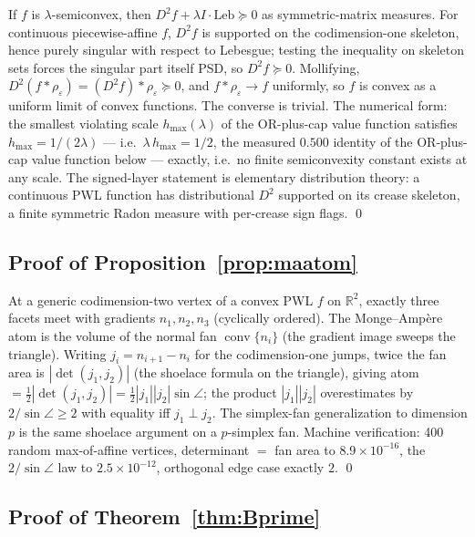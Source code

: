 \documentclass[11pt,a4paper]{article}
\theoremstyle{plain}
\theoremstyle{definition}
\theoremstyle{remark}
\newcommand{\RR}{\mathbb{R}}
\begin{document}
If $f$ is $\lambda$-semiconvex, then $D^2 f + \lambda I \cdot
\mathrm{Leb} \succeq 0$ as symmetric-matrix measures. For continuous
piecewise-affine $f$, $D^2 f$ is supported on the codimension-one
skeleton, hence purely singular with respect to Lebesgue; testing
the inequality on skeleton sets forces the singular part itself
PSD, so $D^2 f \succeq 0$. Mollifying, $D^2(f * \rho_\varepsilon)
= (D^2 f) * \rho_\varepsilon \succeq 0$, and $f * \rho_\varepsilon
\to f$ uniformly, so $f$ is convex as a uniform limit of convex
functions. The converse is trivial. The numerical form: the
smallest violating scale $h_{\max}(\lambda)$ of the OR-plus-cap
value function satisfies $h_{\max} = 1/(2\lambda)$ --- i.e.\
$\lambda\,h_{\max} = 1/2$, the measured $0.500$ identity of the
OR-plus-cap value function below --- exactly, i.e.\ no finite
semiconvexity constant exists at any scale. The signed-layer statement is elementary distribution
theory: a continuous PWL function has distributional $D^2$
supported on its crease skeleton, a finite symmetric Radon measure
with per-crease sign flags. \qed

\subsection{Proof of Proposition~\ref{prop:maatom}}

At a generic codimension-two vertex of a convex PWL $f$ on
$\RR^2$, exactly three facets meet with gradients $n_1, n_2, n_3$
(cyclically ordered). The Monge--Amp\`ere atom is the volume of
the normal fan $\operatorname{conv}\{n_i\}$ (the gradient image
sweeps the triangle). Writing $j_i = n_{i+1} - n_i$ for the
codimension-one jumps, twice the fan area is $|\det(j_1, j_2)|$
(the shoelace formula on the triangle), giving atom $=
\tfrac12|\det(j_1, j_2)| = \tfrac12 |j_1||j_2| \sin\angle$; the
product $|j_1||j_2|$ overestimates by $2/\sin\angle \ge 2$ with
equality iff $j_1 \perp j_2$. The simplex-fan generalization to
dimension $p$ is the same shoelace argument on a $p$-simplex fan.
Machine verification: 400 random max-of-affine vertices,
determinant $=$ fan area to $8.9 \times 10^{-16}$, the
$2/\sin\angle$ law to $2.5 \times 10^{-12}$, orthogonal edge case
exactly $2$. \qed

\subsection{Proof of Theorem~\ref{thm:Bprime}}
\end{document}
